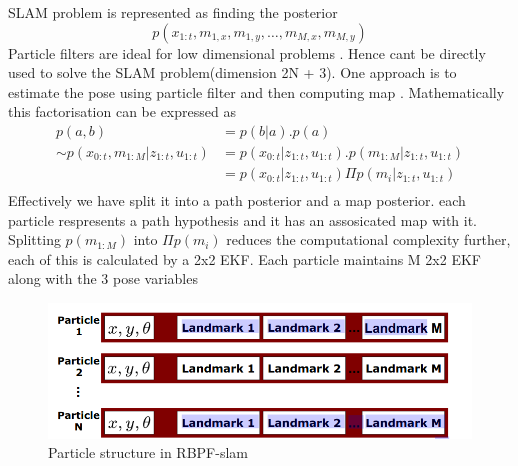 \documentclass{article}
\begin{document}
SLAM problem is represented as finding the posterior
$$p(x_{1:t},m_{1,x},m_{1,y},\dots{},m_{M,x},m_{M,y})$$
Particle filters are ideal for low dimensional problems . Hence cant be directly used to solve the SLAM problem(dimension 2N + 3). One approach is to estimate the pose using particle filter and then computing map . Mathematically this factorisation can be expressed as 
\begin{align*}
    p(a,b) & = p(b|a).p(a)\\
    \sim p(x_{0:t},m_{1:M}|z_{1:t},u_{1:t}) & =  p(x_{0:t}|z_{1:t},u_{1:t}).p(m_{1:M}|z_{1:t},u_{1:t})\\
    & =  p(x_{0:t}|z_{1:t},u_{1:t}) \Pi p(m_{i}|z_{1:t},u_{1:t})\\
\end{align*}
Effectively we have split it into a path posterior and a map posterior. each particle respresents a path hypothesis and it has an assosicated map with it. Splitting $p(m_{1:M})$ into $\Pi p(m_i)$ reduces the computational complexity further, each of this is calculated by a 2x2 EKF. 
\newline
\newline 
Each particle maintains M 2x2 EKF along with the 3 pose variables 
\begin{figure}
    \includegraphics[width = \linewidth]{./RBPF_particles.png}
    \caption{Particle structure in RBPF-slam}
\end{figure}
\end{document}
